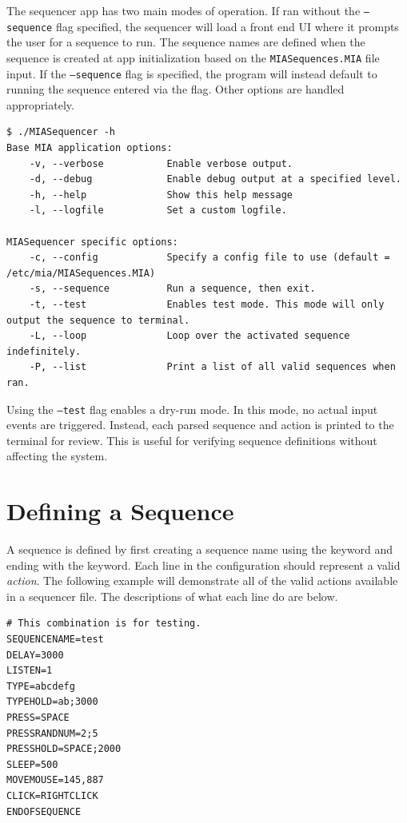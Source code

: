 The sequencer app has two main modes of operation. If ran without the \texttt{--sequence} flag specified, the sequencer will load a front end UI where it prompts the user for a sequence to run. The sequence names are defined when the sequence is created at app initialization based on the \texttt{MIASequences.MIA} file input. If the \texttt{--sequence} flag is specified, the program will instead default to running the sequence entered via the flag. Other options are handled appropriately.

\begin{lstlisting}[style=terminalstyle]
$ ./MIASequencer -h
Base MIA application options:
	-v, --verbose           Enable verbose output.
	-d, --debug             Enable debug output at a specified level.
	-h, --help              Show this help message
	-l, --logfile           Set a custom logfile.

MIASequencer specific options:
	-c, --config            Specify a config file to use (default = /etc/mia/MIASequences.MIA)
	-s, --sequence          Run a sequence, then exit.
	-t, --test              Enables test mode. This mode will only output the sequence to terminal.
	-L, --loop              Loop over the activated sequence indefinitely.
	-P, --list              Print a list of all valid sequences when ran.
\end{lstlisting}

Using the \texttt{--test} flag enables a dry-run mode. In this mode, no actual input events are triggered. Instead, each parsed sequence and action is printed to the terminal for review. This is useful for verifying sequence definitions without affecting the system.


\section{Defining a Sequence}

A sequence is defined by first creating a sequence name using the  keyword and ending with the  keyword. Each line in the configuration should represent a valid \textit{action}. The following example will demonstrate all of the valid actions available in a sequencer file. The descriptions of what each line do are below.

\begin{lstlisting}[style=pythonstyle]
# This combination is for testing.
SEQUENCENAME=test
DELAY=3000
LISTEN=1
TYPE=abcdefg
TYPEHOLD=ab;3000
PRESS=SPACE
PRESSRANDNUM=2;5
PRESSHOLD=SPACE;2000
SLEEP=500
MOVEMOUSE=145,887
CLICK=RIGHTCLICK
ENDOFSEQUENCE
\end{lstlisting}

